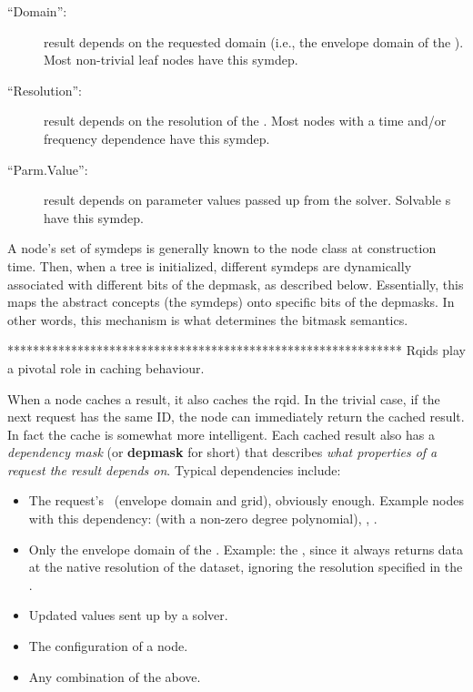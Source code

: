   \begin{description}
  
  \item[``Domain'':] result depends on the requested domain (i.e., the envelope
    domain of the \Cells). Most non-trivial leaf nodes have this symdep.

  \item[``Resolution'':] result depends on the resolution of the \Cells. Most
    nodes with a time and/or frequency dependence have this symdep.
   
  \item[``Parm.Value'':] result depends on parameter values passed up from the
    solver. Solvable \Parm{}s have this symdep.
  
  \end{description}
  
  A node's set of symdeps is generally known to the node class at construction
  time. Then, when a tree is initialized, different symdeps are dynamically
  associated with different bits of the depmask, as described below.
  Essentially, this maps the abstract concepts (the symdeps) onto specific bits
  of the depmasks. In other words, this mechanism is what determines the
  bitmask semantics.



**************************************************************    
  Rqids play a pivotal role in caching behaviour. 
  
  When a node caches a result,
  it also caches the rqid. In the trivial case, if the next request has the
  same ID, the node can immediately return the cached result. In fact the cache
  is somewhat more intelligent. Each cached result also has a {\em dependency
  mask} (or {\bf depmask} for short) that describes {\em what properties of a
  request the result depends on}. Typical dependencies include:

  \begin{itemize} 
  
  \item The request's \Cells\ (envelope domain and grid), obviously enough.
  Example nodes with this dependency:  (with a non-zero degree
  polynomial), , . 

  \item Only the envelope domain of the \Cells. Example: the , since
  it always returns data at the native resolution of the dataset, ignoring the
  resolution specified in the \Cells.

  \item Updated  values sent up by a solver.
  
  \item The configuration of a  node.

  \item Any combination of the above. 

  \end{itemize}
  
